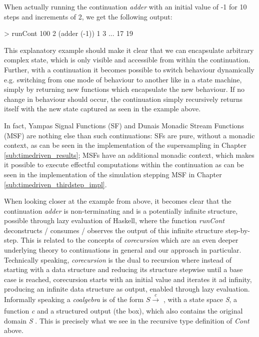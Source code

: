 When actually running the continuation \textit{adder} with an initial value of -1 for 10 steps and increments of 2, we get the following output:

\begin{HaskellCode}
> runCont 100 2 (adder (-1))
1
3
...
17
19
\end{HaskellCode}

This explanatory example should make it clear that we can encapsulate arbitrary complex state, which is only visible and accessible from within the continuation. Further, with a continuation it becomes possible to switch behaviour dynamically e.g. switching from one mode of behaviour to another like in a state machine, simply by returning new functions which encapsulate the new behaviour. If no change in behaviour should occur, the continuation simply recursively returns itself with the new state captured as seen in the example above.

In fact, Yampas Signal Functions (SF) and Dunais Monadic Stream Functions (MSF) are nothing else than such continuations: SFs are pure, without a monadic context, as can be seen in the implementation of the supersampling in Chapter \ref{sub:timedriven_results}; MSFs have an additional monadic context, which makes it possible to execute effectful computations within the continuation as can be seen in the implementation of the simulation stepping MSF in Chapter \ref{sub:timedriven_thirdstep_impl}. 

\medskip

When looking closer at the example from above, it becomes clear that the continuation \textit{adder} is non-terminating and is a potentially infinite structure, possible through lazy evaluation of Haskell, where the function \textit{runCont} deconstructs / consumes / observes the output of this infinite structure step-by-step. This is related to the concepts of \textit{corecursion} which are an even deeper underlying theory to continuations in general and our approach in particular. Technically speaking, \textit{corecursion} is the dual to recursion where instead of starting with a data structure and reducing its structure stepwise until a base case is reached, corecursion starts with an initial value and iterates it ad infinity, producing an infinite data structure as output, enabled through lazy evaluation. Informally speaking a \textit{coalgebra} is of the form $S \xrightarrow[\text{}]{c} $ , with a state space \textit{S}, a function \textit{c} and a structured output (the box), which also contains the original domain \textit{S} \cite{jacobs_introduction_2017}. This is precisely what we see in the recursive type definition of \textit{Cont} above.

